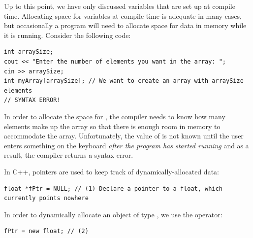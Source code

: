 
Up to this point, we have only discussed variables that are set up at compile time. 
Allocating space for variables at compile time is adequate in many cases, but occasionally a program will need to allocate space for data in memory while it is running. 
Consider the following code:

\noindent\begin{minipage}{\linewidth}\begin{lstlisting}
int arraySize;
cout << "Enter the number of elements you want in the array: ";
cin >> arraySize;
int myArray[arraySize]; // We want to create an array with arraySize elements
// SYNTAX ERROR!
\end{lstlisting}\end{minipage}

In order to allocate the space for , the compiler needs to know how many elements make up the array so that there is enough room in memory to accommodate the array. 
Unfortunately, the value of  is not known until the user enters something on the keyboard \emph{after the program has started running} and as a result, the compiler returns a syntax error. 

In C++, pointers are used to keep track of dynamically-allocated data:

\noindent\begin{minipage}{\linewidth}\begin{lstlisting}
float *fPtr = NULL; // (1) Declare a pointer to a float, which currently points nowhere
\end{lstlisting}\end{minipage}

In order to dynamically allocate an object of type , we use the  operator:

\noindent\begin{minipage}{\linewidth}\begin{lstlisting}
fPtr = new float; // (2)
\end{lstlisting}\end{minipage}

